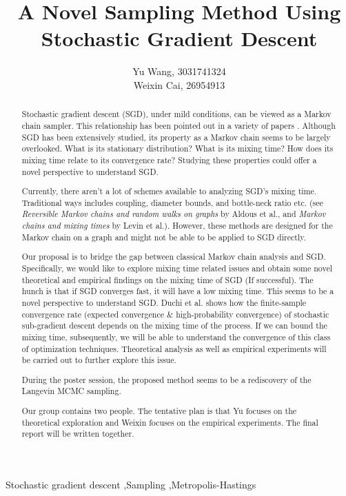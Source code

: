 \documentclass[preprint,12pt,3p]{elsarticle}
\begin{document}
\begin{frontmatter}

\title{A Novel Sampling Method Using Stochastic Gradient Descent}


\author{Yu Wang, 3031741324\\ Weixin Cai, 26954913}

\begin{abstract}
Stochastic gradient descent (SGD), under mild conditions, can be viewed as a Markov chain sampler. This relationship has been pointed out in a variety of papers \cite{kushner2012stochastic, bach2014adaptivity}. Although SGD has been extensively studied, its property as a Markov chain seems to be largely overlooked. What is its stationary distribution? What is its mixing time? How does its mixing time relate to its convergence rate? Studying these properties could offer a novel perspective to understand SGD.

Currently, there aren't a lot of schemes available to analyzing SGD's mixing time. Traditional ways includes coupling, diameter bounds, and bottle-neck ratio etc. (see \emph{Reversible Markov chains and random walks on graphs} by Aldous et al.\cite{aldous2002reversible}, and \emph{Markov chains and mixing times} by Levin et al.\cite{levin2009markov}). However, these methods are designed for the Markov chain on a graph and might not be able to be applied to SGD directly.

Our proposal is to bridge the gap between classical Markov chain analysis and SGD. Specifically,  we would like to explore mixing time related issues and obtain some novel theoretical and empirical findings on the mixing time of SGD (If successful). The hunch is that if SGD converges fast, it will have a low mixing time. This seems to be a novel perspective to understand SGD. Duchi et al.\cite{duchi2012ergodic} shows how the finite-sample convergence rate (expected convergence \& high-probability convergence) of stochastic sub-gradient descent depends on the mixing time of the process. If we can bound the mixing time, subsequently, we will be able to understand the convergence of this class of optimization techniques. Theoretical analysis as well as empirical experiments will be carried out to further explore this issue.

During the poster session, the proposed method seems to be a rediscovery of the Langevin MCMC sampling.

Our group contains two people. The tentative plan is that Yu focuses on the theoretical exploration and Weixin focuses on the empirical experiments. The final report will be written together.
\end{abstract}

\begin{keyword}
Stochastic gradient descent \sep Sampling \sep Metropolis-Hastings
\end{keyword}

\end{frontmatter}
\end{document}
